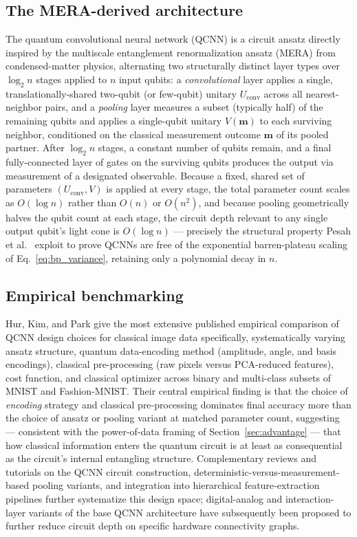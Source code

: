 \documentclass[11pt]{article}
\begin{document}
\subsection{The MERA-derived architecture}
The quantum convolutional neural network (QCNN) \cite{Cong2019} is a circuit ansatz directly inspired by the multiscale entanglement renormalization ansatz (MERA) from condensed-matter physics, alternating two structurally distinct layer types over $\log_2 n$ stages applied to $n$ input qubits: a \emph{convolutional} layer applies a single, translationally-shared two-qubit (or few-qubit) unitary $U_{\text{conv}}$ across all nearest-neighbor pairs, and a \emph{pooling} layer measures a subset (typically half) of the remaining qubits and applies a single-qubit unitary $V(\bm{m})$ to each surviving neighbor, conditioned on the classical measurement outcome $\bm{m}$ of its pooled partner. After $\log_2 n$ stages, a constant number of qubits remain, and a final fully-connected layer of gates on the surviving qubits produces the output via measurement of a designated observable. Because a fixed, shared set of parameters $(U_{\text{conv}},V)$ is applied at every stage, the total parameter count scales as $O(\log n)$ rather than $O(n)$ or $O(n^2)$, and because pooling geometrically halves the qubit count at each stage, the circuit depth relevant to any single output qubit's light cone is $O(\log n)$ — precisely the structural property Pesah et al.\ \cite{Pesah2021} exploit to prove QCNNs are free of the exponential barren-plateau scaling of Eq.~\eqref{eq:bp_variance}, retaining only a polynomial decay in $n$.

\subsection{Empirical benchmarking}
Hur, Kim, and Park \cite{Hur2022} give the most extensive published empirical comparison of QCNN design choices for classical image data specifically, systematically varying ansatz structure, quantum data-encoding method (amplitude, angle, and basis encodings), classical pre-processing (raw pixels versus PCA-reduced features), cost function, and classical optimizer across binary and multi-class subsets of MNIST and Fashion-MNIST. Their central empirical finding is that the choice of \emph{encoding} strategy and classical pre-processing dominates final accuracy more than the choice of ansatz or pooling variant at matched parameter count, suggesting — consistent with the power-of-data framing of Section~\ref{sec:advantage} — that how classical information enters the quantum circuit is at least as consequential as the circuit's internal entangling structure. Complementary reviews and tutorials on the QCNN circuit construction, deterministic-versus-measurement-based pooling variants, and integration into hierarchical feature-extraction pipelines further systematize this design space; digital-analog and interaction-layer variants of the base QCNN architecture have subsequently been proposed to further reduce circuit depth on specific hardware connectivity graphs.
\end{document}
